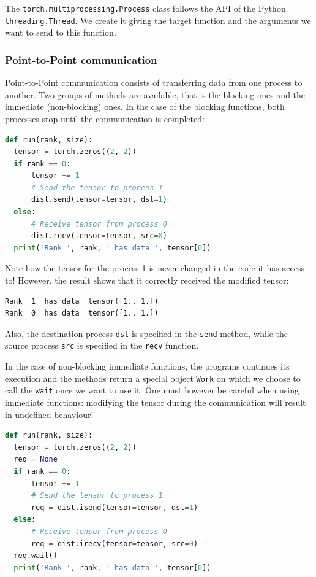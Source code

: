\documentclass{article}
\begin{document}
The \lstinline{torch.multiprocessing.Process} class follows the API of the Python \lstinline{threading.Thread}. We create it giving the target function and the arguments we want to send to this function.

\subsubsection{Point-to-Point communication}
Point-to-Point communication consists of transferring data from one process to another. Two groups of methods are available, that is the blocking ones and the immediate (non-blocking) ones. In the case of the blocking functions, both processes stop until the communication is completed:

\begin{lstlisting}[language=Python]
def run(rank, size):
  tensor = torch.zeros((2, 2))
  if rank == 0:
      tensor += 1
      # Send the tensor to process 1
      dist.send(tensor=tensor, dst=1)
  else:
      # Receive tensor from process 0
      dist.recv(tensor=tensor, src=0)
  print('Rank ', rank, ' has data ', tensor[0])
\end{lstlisting}
Note how the tensor for the process 1 is never changed in the code it has access to! However, the result shows that it correctly received the modified tensor:
\begin{lstlisting}
Rank  1  has data  tensor([1., 1.])
Rank  0  has data  tensor([1., 1.])
\end{lstlisting}
Also, the destination process \lstinline{dst} is specified in the \lstinline{send} method, while the source process \lstinline{src} is specified in the \lstinline{recv} function.

In the case of non-blocking immediate functions, the programs continues its execution and the methods return a special object \lstinline{Work} on which we choose to call the \lstinline{wait} once we want to use it. One must however be careful when using immediate functions: modifying the tensor during the communication will result in undefined behaviour!

\begin{lstlisting}[language=Python]
def run(rank, size):
  tensor = torch.zeros((2, 2))
  req = None
  if rank == 0:
      tensor += 1
      # Send the tensor to process 1
      req = dist.isend(tensor=tensor, dst=1)
  else:
      # Receive tensor from process 0
      req = dist.irecv(tensor=tensor, src=0)
  req.wait()
  print('Rank ', rank, ' has data ', tensor[0])
\end{lstlisting}
\end{document}
